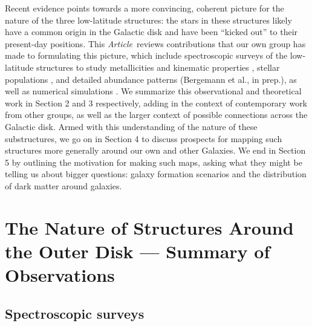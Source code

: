 \documentclass[galaxies,article,submit,moreauthors,pdftex,10pt,a4paper]{mdpi}
\newcommand{\documentname}{\emph{Article}}
\begin{document}
Recent evidence points towards a more convincing, coherent picture for the
nature of the three low-latitude structures: the stars in these structures
likely have a common origin in the Galactic disk and have been ``kicked out''
to their present-day positions.
This \documentname\ reviews contributions that our own group has made to formulating this picture, which include spectroscopic surveys of the low-latitude structures to study metallicities and kinematic properties \cite{sheffield14,li17}, stellar populations \cite{pricewhelan15}, and detailed abundance patterns (Bergemann et al., in prep.), as well as numerical simulations \cite{sheffield14,pricewhelan15,laporte16}.
We summarize this observational and theoretical work in Section 2 and 3 respectively, adding in the context of contemporary work from other groups, as well as the larger context of possible connections across the Galactic disk.
Armed with this understanding of the nature of these substructures, we go on in Section 4 to discuss prospects for mapping such structures more generally around our own and other Galaxies.
We end in Section 5 by outlining the motivation for making such maps, asking what they might be telling us about bigger questions: galaxy formation scenarios and the distribution of dark matter around galaxies.


\section{The Nature of Structures Around the Outer Disk --- Summary of Observations}
\label{sec:obs}

\subsection{Spectroscopic surveys}
\end{document}
